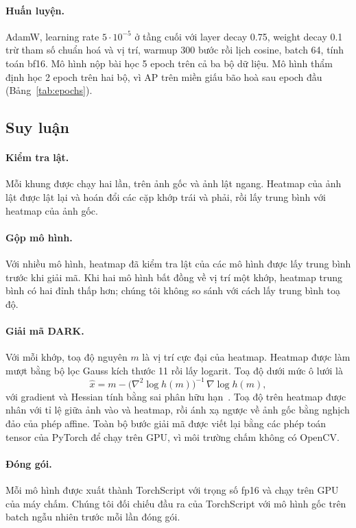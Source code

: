 \documentclass[11pt,a4paper]{article}
\begin{document}
\paragraph{Huấn luyện.} AdamW, learning rate $5\cdot10^{-5}$ ở tầng cuối với layer decay 0.75, weight decay 0.1 trừ tham số chuẩn hoá và vị trí, warmup 300 bước rồi lịch cosine, batch 64, tính toán bf16. Mô hình nộp bài học 5 epoch trên cả ba bộ dữ liệu. Mô hình thẩm định học 2 epoch trên hai bộ, vì AP trên miền giấu bão hoà sau epoch đầu (Bảng~\ref{tab:epochs}).

\subsection{Suy luận}
\label{sec:infer}

\paragraph{Kiểm tra lật.} Mỗi khung được chạy hai lần, trên ảnh gốc và ảnh lật ngang. Heatmap của ảnh lật được lật lại và hoán đổi các cặp khớp trái và phải, rồi lấy trung bình với heatmap của ảnh gốc.

\paragraph{Gộp mô hình.} Với nhiều mô hình, heatmap đã kiểm tra lật của các mô hình được lấy trung bình trước khi giải mã. Khi hai mô hình bất đồng về vị trí một khớp, heatmap trung bình có hai đỉnh thấp hơn; chúng tôi không so sánh với cách lấy trung bình toạ độ.

\paragraph{Giải mã DARK.} Với mỗi khớp, toạ độ nguyên $m$ là vị trí cực đại của heatmap. Heatmap được làm mượt bằng bộ lọc Gauss kích thước 11 rồi lấy logarit. Toạ độ dưới mức ô lưới là
\begin{equation}
\hat x = m - \big(\nabla^2 \log h(m)\big)^{-1}\,\nabla\log h(m),
\end{equation}
với gradient và Hessian tính bằng sai phân hữu hạn~\cite{dark}. Toạ độ trên heatmap được nhân với tỉ lệ giữa ảnh vào và heatmap, rồi ánh xạ ngược về ảnh gốc bằng nghịch đảo của phép affine. Toàn bộ bước giải mã được viết lại bằng các phép toán tensor của PyTorch để chạy trên GPU, vì môi trường chấm không có OpenCV.

\paragraph{Đóng gói.} Mỗi mô hình được xuất thành TorchScript với trọng số fp16 và chạy trên GPU của máy chấm. Chúng tôi đối chiếu đầu ra của TorchScript với mô hình gốc trên batch ngẫu nhiên trước mỗi lần đóng gói.
\end{document}
